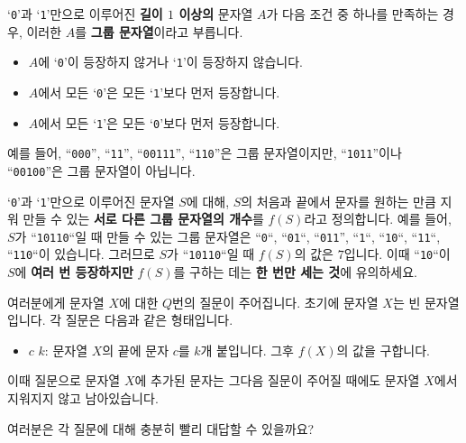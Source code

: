 `\texttt{0}'과 `\texttt{1}'만으로 이루어진 \textbf{길이 $1$ 이상의} 문자열 $A$가 다음 조건 중 하나를 만족하는 경우, 이러한 $A$를 \textbf{그룹 문자열}이라고 부릅니다.

\begin{itemize}
\item $A$에 `\texttt{0}'이 등장하지 않거나 `\texttt{1}'이 등장하지 않습니다.
\item $A$에서 모든 `\texttt{0}'은 모든 `\texttt{1}'보다 먼저 등장합니다.
\item $A$에서 모든 `\texttt{1}'은 모든 `\texttt{0}'보다 먼저 등장합니다.
\end{itemize}

예를 들어, ``\texttt{000}'', ``\texttt{11}'', ``\texttt{00111}'', ``\texttt{110}''은 그룹 문자열이지만, ``\texttt{1011}''이나 ``\texttt{00100}''은 그룹 문자열이 아닙니다.

`\texttt{0}'과 `\texttt{1}'만으로 이루어진 문자열 $S$에 대해, $S$의 처음과 끝에서 문자를 원하는 만큼 지워 만들 수 있는 \textbf{서로 다른 그룹 문자열의 개수}를 $f(S)$라고 정의합니다. 예를 들어, $S$가 ``\texttt{10110}``일 때 만들 수 있는 그룹 문자열은 ``\texttt{0}``, ``\texttt{01}``, ``\texttt{011}'', ``\texttt{1}``, ``\texttt{10}``, ``\texttt{11}``, ``\texttt{110}``이 있습니다. 그러므로 $S$가 ``\texttt{10110}``일 때 $f(S)$의 값은 $7$입니다. 이때 ``\texttt{10}``이 $S$에 \textbf{여러 번 등장하지만} $f(S)$를 구하는 데는 \textbf{한 번만 세는 것}에 유의하세요.

여러분에게 문자열 $X$에 대한 $Q$번의 질문이 주어집니다. 초기에 문자열 $X$는 빈 문자열입니다. 각 질문은 다음과 같은 형태입니다.

\begin{itemize}
\item $c$ $k$: 문자열 $X$의 끝에 문자 $c$를 $k$개 붙입니다. 그후 $f(X)$의 값을 구합니다.
\end{itemize}

이때 질문으로 문자열 $X$에 추가된 문자는 그다음 질문이 주어질 때에도 문자열 $X$에서 지워지지 않고 남아있습니다.

여러분은 각 질문에 대해 충분히 빨리 대답할 수 있을까요?